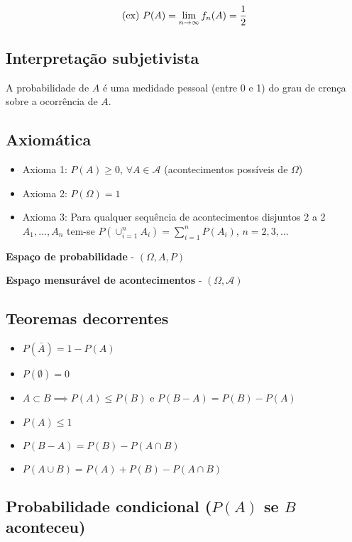 \documentclass{article}
\begin{document}
$$ \textnormal{(ex) }P(A) = \lim_{n\to\infty}f_n(A)=\frac{1}{2} $$

\subsection{Interpretação subjetivista}

A probabilidade de $A$ é uma medidade pessoal (entre 0 e 1) do grau de crença sobre a ocorrência de $A$.

\subsection{Axiomática}

\begin{itemize}
    \item Axioma 1: $P(A) \geq 0$, $\forall A \in \mathcal{A}$ (acontecimentos possíveis de $\Omega$)
    \item Axioma 2: $P(\Omega) = 1$
    \item Axioma 3: Para qualquer sequência de acontecimentos disjuntos 2 a 2 $A_1, \dots, A_n$ tem-se $P(\cup_{i=1}^n A_i) = \sum_{i=1}^n P(A_i)$, $n = 2, 3, \dots$
\end{itemize}

\textbf{Espaço de probabilidade} - $(\Omega, A, P)$

\textbf{Espaço mensurável de acontecimentos} - $(\Omega, \mathcal{A})$

\subsection{Teoremas decorrentes}

\begin{itemize}
    \item $P(\bar{A}) = 1 - P(A)$
    \item $P(\emptyset) = 0$
    \item $A \subset B \implies P(A) \leq P(B)$ e $P(B - A) = P(B) - P(A)$
    \item $P(A) \leq 1$
    \item $P(B - A) = P(B) - P(A \cap B)$
    \item $P(A \cup B) = P(A) + P(B) - P(A \cap B)$
\end{itemize}

\subsection{Probabilidade condicional ($P(A)$ se $B$ aconteceu)}
\end{document}
